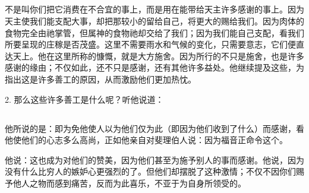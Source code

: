 
\subsection{}

\par

不是叫你们把它消费在不合宜的事上，而是用在能带给天主许多感谢的事上。因为天主使我们能支配大事，却把那较小的留给自己，将更大的赐给我们。因为肉体的食物完全由祂掌管，但属神的食物祂却交给了我们；因为我们能自己支配，看我们所要呈现的庄稼是否茂盛。这里不需要雨水和气候的变化，只需要意志，它们便直达天上。他在这里所称的慷慨，就是大方施舍。因为所行的不只是施舍，也是许多感谢的缘由；不仅如此，还不只是感谢，还有其他许多益处。他继续提及这些，为指出这是许多善工的原因，从而激励他们更加热忱。\par

2. 那么这些许多善工是什么呢？听他说道：\par


\subsection{}

\par

他所说的是：即为免他使人以为他们仅为此（即因为他们收到了什么）而感谢，看他使他们的心志多么高尚，正如他亲自对斐理伯人说：因为福音正命令这个。\par

他说：这也成为对他们的赞美，因为他们甚至为施予别人的事而感谢。他说，因为没有什么比穷人的嫉妒心更强烈的了。但他们却摆脱了这种激情；不仅不因你们赐予他人之物而感到痛苦，反而为此喜乐，不亚于为自身所领受的。\par


